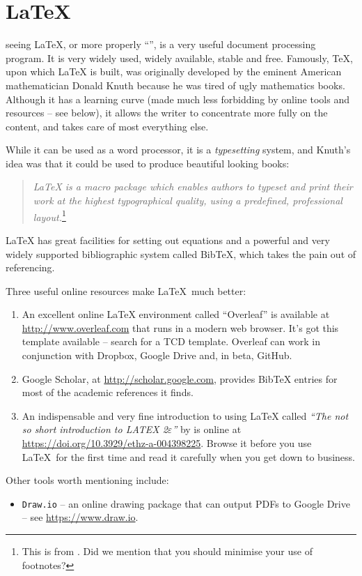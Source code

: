 \chapter{\LaTeX}
\label{latexchapter}
seeing \LaTeX{}, or more properly ``\LaTeXe{}'', is a very useful document processing program. It is very widely used, widely available, stable and free. Famously, \TeX, upon which \LaTeX{} is built, was originally developed by the eminent American mathematician Donald Knuth because he was tired of ugly mathematics books\cite{shustek2008interview}. Although it has a learning curve (made much less forbidding by online tools and resources -- see below), it allows the writer to concentrate more fully on the content, and takes care of most everything else.

While it can be used as a word processor, it is a \emph{typesetting} system, and Knuth's idea was that it could be used to produce beautiful looking books:
\begin{quote}
\emph{\LaTeX{} is a macro package which enables authors to typeset and print their work at the highest typographical quality, using a predefined, professional layout.}\footnote{This is from \citet{oetiker2001not}. Did we mention that you should minimise your use of footnotes?}
\end{quote}
\LaTeX{} has great facilities for setting out equations and a powerful and very widely supported bibliographic system called BibTeX, which takes the pain out of referencing.

Three useful online resources make \LaTeX~much better:
\begin{enumerate}[(1)]
\item An excellent online \LaTeX{} environment called ``Overleaf'' is available at \url{http://www.overleaf.com} that runs in a modern web browser. It's got this template available -- search for a TCD template. Overleaf can work in conjunction with Dropbox, Google Drive and, in beta, GitHub.
\item Google Scholar, at \url{http://scholar.google.com}, provides BibTeX entries for most of the academic references it finds.
\item An indispensable and very fine introduction to using \LaTeX{} called \emph{``The not so short introduction to LATEX 2$\varepsilon$''} by \citet{oetiker2001not} is online at \url{https://doi.org/10.3929/ethz-a-004398225}. Browse it before you use \LaTeX~for the first time and  read it carefully when you get down to business.
\end{enumerate}
Other tools worth mentioning include:
\begin{itemize}
\item \texttt{Draw.io} -- an online drawing package that can output PDFs to Google Drive -- see \url{https://www.draw.io}.
\end{itemize}